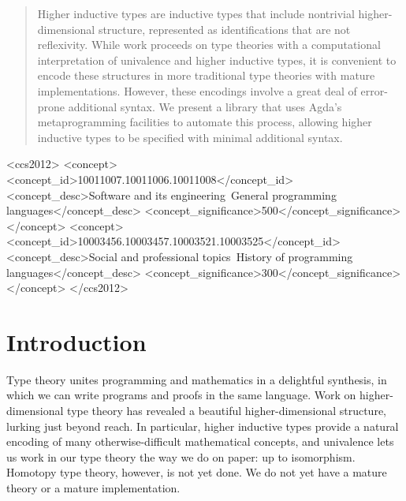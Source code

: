 \documentclass[sigplan,10pt]{acmart}
\begin{document}


\begin{abstract}
Higher inductive types are inductive types that include nontrivial higher-dimensional structure, represented as identifications that are not reflexivity. While work proceeds on type theories with a computational interpretation of univalence and higher inductive types, it is convenient to encode these structures in more traditional type theories with mature implementations. However, these encodings involve a great deal of error-prone additional syntax. We present a library that uses Agda's metaprogramming facilities to automate this process, allowing higher inductive types to be specified with minimal additional syntax.
\end{abstract}

%
%
\begin{CCSXML}
<ccs2012>
<concept>
<concept_id>10011007.10011006.10011008</concept_id>
<concept_desc>Software and its engineering~General programming languages</concept_desc>
<concept_significance>500</concept_significance>
</concept>
<concept>
<concept_id>10003456.10003457.10003521.10003525</concept_id>
<concept_desc>Social and professional topics~History of programming languages</concept_desc>
<concept_significance>300</concept_significance>
</concept>
</ccs2012>
\end{CCSXML}



\maketitle

\section{Introduction}
\label{sec:intro}

Type theory unites programming and mathematics in a delightful synthesis, in which we can write programs and proofs in the same language.
Work on higher-dimensional type theory has revealed a beautiful higher-dimensional structure, lurking just beyond reach.
In particular, higher inductive types provide a natural encoding of many otherwise-difficult mathematical concepts, and univalence lets us work in our type theory the way we do on paper: up to isomorphism.
Homotopy type theory, however, is not yet done.
We do not yet have a mature theory or a mature implementation.
\end{document}
